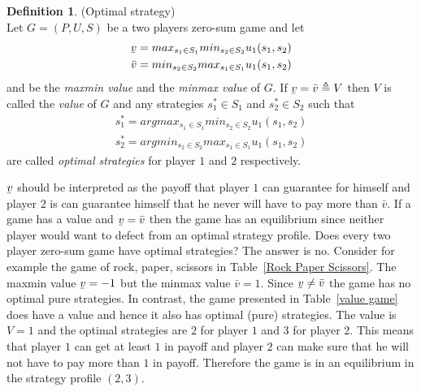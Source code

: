 \documentclass{article}
\theoremstyle{definition}
\newtheorem{definition}[theorem]{Definition}
\theoremstyle{remark}
\newcommand{\ubar}[1]{\underaccent{\bar}{#1}}
\begin{document}
\begin{definition} (Optimal strategy)\label{optimal strategy}\\

  Let $G = (P,U,S)$ be a two players zero-sum game and
  let 
\begin{equation}
\begin{gathered}
\ubar{v} = max_{s_1 \in S_1} min_{s_2 \in S_2}u_1(s_1,s_2) \\
\bar{v} = min_{s_2 \in S_2} max_{s_1 \in S_1}u_1(s_1,s_2)
\end{gathered}
\end{equation} and
   be the \emph{maxmin value} and the \emph{minmax value}
of $G$. If $\ubar{v} = \bar{v} \triangleq V$ then $V$ is called the
\emph{value} of $G$ and any strategies $s_1^* \in S_1$ and $s_2^* \in S_2$
such that 
\begin{equation}
\begin{gathered}
s_1^* = argmax_{s_1 \in S_1} min_{s_2 \in S_2}u_1(s_1,s_2) \\
s_2^* = argmin_{s_2 \in S_2} max_{s_1 \in S_1}u_1(s_1,s_2)
\end{gathered}
\end{equation}
are called \emph{optimal strategies} for player $1$ and
$2$ respectively. \citep{Maschler}
\end{definition}

$\ubar{v}$ should be interpreted as the payoff that player $1$ can
guarantee for himself and player $2$ is can guarantee himself that he
never will have to pay more than $\bar{v}$. If a game has a value and
$\ubar{v} = \bar{v}$ then the game has an equilibrium since neither
player would want to defect from an optimal strategy profile. Does
every two player zero-sum game have optimal strategies? The answer is
no. Consider for example the game of rock, paper, scissors in
Table~\ref{Rock Paper Scissors}. The maxmin value $\ubar{v} = -1$ but
the minmax value $\bar{v} = 1$. Since $\ubar{v} \neq \bar{v}$ the game
has no optimal pure strategies. In contrast, the game presented in
Table~\ref{value game} does have a value and hence it also has optimal
(pure) strategies. The value is $V = 1$ and the optimal strategies are
$2$ for player $1$ and $3$ for player $2$. This means that player $1$
can get at least $1$ in payoff and player $2$ can make sure that he
will not have to pay more than $1$ in payoff. Therefore the game is in
an equilibrium in the strategy profile $(2,3)$.
\end{document}
